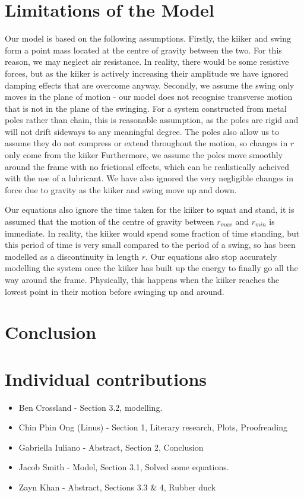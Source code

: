 \documentclass[12pt]{article}
\begin{document}
\section{Limitations of the Model}

Our model is based on the following assumptions.
Firstly, the kiiker and swing form a point mass located at the centre of gravity between the two. For this reason, we may neglect air resistance. In reality, there would be some resistive forces, but as the kiiker is actively increasing their amplitude we have ignored damping effects that are overcome anyway.
Secondly, we assume the swing only moves in the plane of motion - our model does not recognise transverse motion that is not in the plane of the swinging. For a system constructed from metal poles rather than chain, this is reasonable assumption, as the poles are rigid and will not drift sideways to any meaningful degree. The poles also allow us to assume they do not compress or extend throughout the motion, so changes in $r$ only come from the kiiker 
Furthermore, we assume the poles move smoothly around the frame with no frictional effects, which can be realistically acheived with the use of a lubricant. We have also ignored the very negligible changes in force due to gravity as the kiiker and swing move up and down.

Our equations also ignore the time taken for the kiiker to squat and stand, it is assumed that the motion of the centre of gravity between $r_{max}$ and $r_{min}$ is immediate. In reality, the kiiker would spend some fraction of time standing, but this period of time is very small compared to the period of a swing, so has been modelled as a discontinuity in length $r$.
Our equations also stop accurately modelling the system once the kiiker has built up the energy to finally go all the way around the frame. Physically, this happens when the kiiker reaches the lowest point in their motion before swinging up and around.

\section{Conclusion}


\section{Individual contributions}
\begin{itemize}
    \item Ben Crossland - Section 3.2, modelling.
    \item Chin Phin Ong (Linus) - Section 1, Literary research, Plots, Proofreading
    \item Gabriella Iuliano - Abstract, Section 2, Conclusion
    \item Jacob Smith - Model, Section 3.1, Solved some equations.
    \item Zayn Khan - Abstract, Sections 3.3$\And$4, Rubber duck
\end{itemize}
\end{document}
